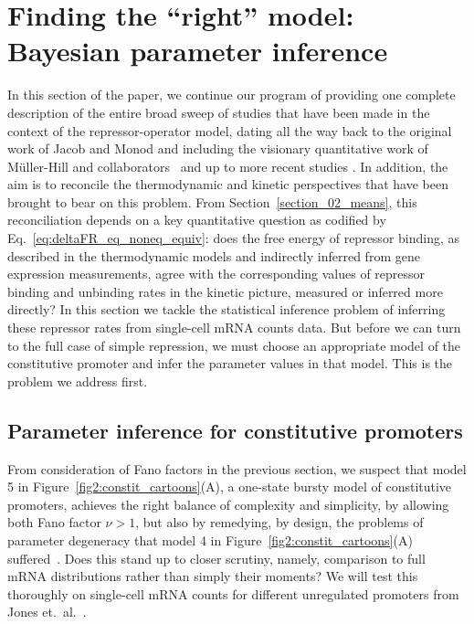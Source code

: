 \section{Finding the ``right'' model: Bayesian parameter inference}
\label{section_04_bayesian_inference}

In this section of the paper, we continue our program of providing one complete
description of the entire broad sweep of studies that have been made in the
context of the repressor-operator model, dating all the way back to the original
work of Jacob and Monod and including the visionary quantitative work of
M\"{u}ller-Hill and collaborators~\cite{Oehler1990} and up to more recent
studies \cite{Garcia2011a}. In addition, the aim is to reconcile the
thermodynamic and kinetic perspectives that have been brought to bear on this
problem. From Section~\ref{section_02_means}, this reconciliation depends on a
key quantitative question as codified by Eq.~\ref{eq:deltaFR_eq_noneq_equiv}:
does the free energy of repressor binding, as described in the thermodynamic
models and indirectly inferred from gene expression measurements, agree with the
corresponding values of repressor binding and unbinding rates in the kinetic
picture, measured or inferred more directly? In this section we tackle the
statistical inference problem of inferring these repressor rates from
single-cell mRNA counts data. But before we can turn to the full case of simple
repression, we must choose an appropriate model of the constitutive promoter and
infer the parameter values in that model. This is the problem we address first.


\subsection{Parameter inference for constitutive promoters}

From consideration of Fano factors in the previous section, we suspect that
model 5 in Figure~\ref{fig2:constit_cartoons}(A), a one-state bursty model of
constitutive promoters, achieves the right balance of complexity and simplicity,
by allowing both Fano factor $\nu>1$, but also by remedying, by design, the
problems of parameter degeneracy that model 4 in
Figure~\ref{fig2:constit_cartoons}(A) suffered~\cite{Razo-Mejia2020}. Does this
stand up to closer scrutiny, namely, comparison to full mRNA distributions
rather than simply their moments? We will test this thoroughly on single-cell
mRNA counts for different unregulated promoters from Jones et.\
al.~\cite{Jones2014}.

